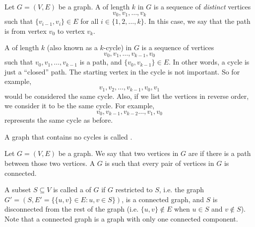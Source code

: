 \begin{definition}
\label{definition:Paths-and-cycles}
Let $G=(V,E)$ be a graph. A  of length $k$ in $G$ is a sequence of \emph{distinct} vertices $$v_0,v_1,\ldots,v_k$$ such that $\{v_{i-1}, v_i\} \in E$ for all $i \in \{1,2,\ldots,k\}$. In this case, we say that the path is from vertex $v_0$ to vertex $v_k$.

A  of length $k$ (also known as a $k$-cycle) in $G$ is a sequence of vertices $$v_0, v_1, \ldots, v_{k-1}, v_0$$ such that $v_0, v_1, \ldots, v_{k-1}$ is a path, and $\{v_0,v_{k-1}\} \in E$. In other words, a cycle is just a ``closed'' path. The starting vertex in the cycle is not important. So for example,
$$v_1, v_2, \ldots, v_{k-1},v_0,v_1$$
would be considered the same cycle. Also, if we list the vertices in reverse order, we consider it to be the same cycle. For example, 
$$v_0, v_{k-1}, v_{k-2} \ldots, v_1, v_0$$
represents the same cycle as before.

A graph that contains no cycles is called .

\end{definition}

\begin{definition}
\label{definition:Connected-graph-connected-component}
Let $G = (V,E)$ be a graph. We say that two vertices in $G$ are  if there is a path between those two vertices. A  $G$ is such that every pair of vertices in $G$ is connected.

A subset $S \subseteq V$ is called a  of $G$ if $G$ restricted to $S$, i.e. the graph $G' = (S, E' = \{\{u,v\} \in E : u,v \in S\})$, is a connected graph, and $S$ is disconnected from the rest of the graph (i.e. $\{u,v\} \not \in E$ when $u \in S$ and $v \not \in S$). Note that a connected graph is a graph with only one connected component.

\end{definition}

